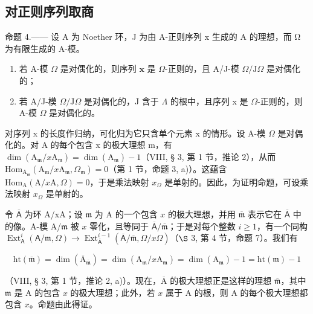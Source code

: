 \subsection{对正则序列取商}

命题 4.—— 设 A 为 Noether 环，J 为由 A-正则序列 x 生成的 A 的理想，而 Ω 为有限生成的 A-模。

\begin{enumerate}
\def\labelenumi{\alph{enumi})}
\item
  若 A-模 \(\Omega\) 是对偶化的，则序列 \(\mathbf{x}\) 是 \(\Omega\)-正则的，且 A/J-模 \(\Omega/\mathrm{J}\Omega\) 是对偶化的；
\item
  若 A/J-模 \(\Omega/\mathrm{J}\Omega\) 是对偶化的，J 含于 \(\Lambda\) 的根中，且序列 x 是 \(\Omega\)-正则的，则 A-模 \(\Omega\) 是对偶化的。
\end{enumerate}

对序列 x 的长度作归纳，可化归为它只含单个元素 x 的情形。设 A-模 \(\Omega\) 是对偶化的。对 A 的每个包含 x 的极大理想 m，有 \(\dim(\mathrm{A}_{\mathfrak{m}}/x\mathrm{A}_{\mathfrak{m}})=\dim(\mathrm{A}_{\mathfrak{m}})-1\)（VIII, § 3, 第 1 节，推论 2），从而 \(\mathrm{Hom}_{\mathrm{A}_{\mathfrak{m}}}\left(\mathrm{A}_{\mathfrak{m}} / x\mathrm{A}_{\mathfrak{m}}, \Omega_{\mathfrak{m}}\right) = 0\)（第 1 节，命题 3, a)）。这蕴含 \(\mathrm{Hom}_{\mathrm{A}}(\mathrm{A} / x\mathrm{A}, \Omega) = 0\)，于是乘法映射 \(x_{\Omega}\) 是单射的。因此，为证明命题，可设乘法映射 \(x_{\Omega}\) 是单射的。

令 \(\overline{\mathsf{A}}\) 为环 A/xA；设 \(\mathfrak{m}\) 为 A 的一个包含 \(x\) 的极大理想，并用 \(\overline{\mathfrak{m}}\) 表示它在 \(\overline{\mathsf{A}}\) 中的像。A-模 A/\(\mathfrak{m}\) 被 \(x\) 零化，且等同于 \(\overline{\mathsf{A}}/\overline{\mathfrak{m}}\)；于是对每个整数 \(i \geqslant 1\)，有一个同构 \(\operatorname{Ext}_{\mathsf{A}}^{i}(\mathsf{A}/\mathfrak{m}, \Omega) \longrightarrow \operatorname{Ext}_{\overline{\mathsf{A}}}^{i-1}(\overline{\mathsf{A}}/\overline{\mathfrak{m}}, \Omega/x\Omega)\)（\(\S\) 3, 第 4 节，命题 7）。我们有

\[
\mathrm{ht} (\overline {{\mathfrak {m}}}) = \dim (\overline {{\mathrm{A}}} _ {\overline {{\mathfrak {m}}}}) = \dim (\mathrm{A} _ {\mathfrak {m}} / x \mathrm{A} _ {\mathfrak {m}}) = \dim (\mathrm{A} _ {\mathfrak {m}}) - 1 = \mathrm{ht} (\mathfrak {m}) - 1
\]

（VIII, § 3, 第 1 节，推论 2, a)）。现在，\(\overline{\mathrm{A}}\) 的极大理想正是这样的理想 \(\overline{\mathfrak{m}}\)，其中 \(\mathfrak{m}\) 是 A 的包含 \(x\) 的极大理想；此外，若 \(x\) 属于 A 的根，则 A 的每个极大理想都包含 \(x\)。命题由此得证。

